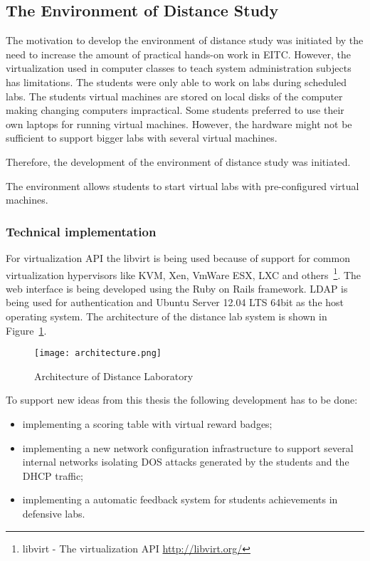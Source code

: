 \subsection{The Environment of Distance Study}
\label{The Environment of Distance Study}
The motivation to develop the environment of distance study was initiated by the need to increase the amount of practical hands-on work in \gls{EITC}. However, the virtualization used in computer classes to teach system administration subjects has limitations. The students were only able to work on labs during scheduled labs.
The students virtual machines are stored on local disks of the computer making changing computers impractical. Some students preferred to use their own laptops for running virtual machines. However, the hardware might not be sufficient to support bigger labs with several virtual machines.

Therefore, the development of the environment of distance study was initiated.

The environment allows students to start virtual labs with pre-configured virtual machines.
 
\subsubsection{Technical implementation}
For virtualization \gls{API} the libvirt is being used because of support for common virtualization hypervisors like \gls{KVM}, Xen, VmWare ESX, LXC and others~\footnote{libvirt - The virtualization API \url{http://libvirt.org/}}. The web interface is being developed using the Ruby on Rails framework. \gls{LDAP} is being used for authentication and Ubuntu Server 12.04 LTS 64bit as the host operating system. The architecture of the distance lab system is shown in Figure~\ref{fig:Architecture of Distance Laboratory}.

\begin{figure}[ht]
\centering
\texttt{[image: architecture.png]}
\caption{Architecture of Distance Laboratory}
\label{fig:Architecture of Distance Laboratory}
\end{figure}

To support new ideas from this thesis the following development has to be done:
\begin{itemize}
\item implementing a scoring table with virtual reward badges;
\item implementing a new  network configuration infrastructure to support several internal networks isolating \gls{DOS} attacks generated by the students and the \gls{DHCP} traffic;
\item implementing a automatic feedback system for students achievements  in defensive labs.
\end{itemize}

